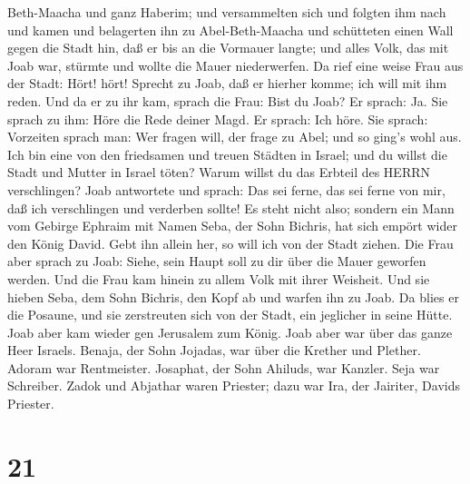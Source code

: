 Beth-Maacha und ganz Haberim; und versammelten sich und folgten ihm nach
 und kamen und belagerten ihn zu Abel-Beth-Maacha und
schütteten einen Wall gegen die Stadt hin, daß er bis an die Vormauer
langte; und alles Volk, das mit Joab war, stürmte und wollte die Mauer
niederwerfen.  Da rief eine weise Frau aus der Stadt: Hört!
hört! Sprecht zu Joab, daß er hierher komme; ich will mit ihm reden.
 Und da er zu ihr kam, sprach die Frau: Bist du Joab? Er
sprach: Ja. Sie sprach zu ihm: Höre die Rede deiner Magd. Er sprach: Ich
höre.  Sie sprach: Vorzeiten sprach man: Wer fragen will,
der frage zu Abel; und so ging's wohl aus.  Ich bin eine
von den friedsamen und treuen Städten in Israel; und du willst die Stadt
und Mutter in Israel töten? Warum willst du das Erbteil des HERRN
verschlingen?  Joab antwortete und sprach: Das sei ferne,
das sei ferne von mir, daß ich verschlingen und verderben sollte! Es
steht nicht also;  sondern ein Mann vom Gebirge Ephraim mit
Namen Seba, der Sohn Bichris, hat sich empört wider den König David.
Gebt ihn allein her, so will ich von der Stadt ziehen. Die Frau aber
sprach zu Joab: Siehe, sein Haupt soll zu dir über die Mauer geworfen
werden.  Und die Frau kam hinein zu allem Volk mit ihrer
Weisheit. Und sie hieben Seba, dem Sohn Bichris, den Kopf ab und warfen
ihn zu Joab. Da blies er die Posaune, und sie zerstreuten sich von der
Stadt, ein jeglicher in seine Hütte. Joab aber kam wieder gen Jerusalem
zum König.  Joab aber war über das ganze Heer Israels.
Benaja, der Sohn Jojadas, war über die Krether und Plether.
 Adoram war Rentmeister. Josaphat, der Sohn Ahiluds, war
Kanzler.  Seja war Schreiber. Zadok und Abjathar waren
Priester;  dazu war Ira, der Jairiter, Davids Priester.

\hypertarget{section-20}{%
\section{21}\label{section-20}}

